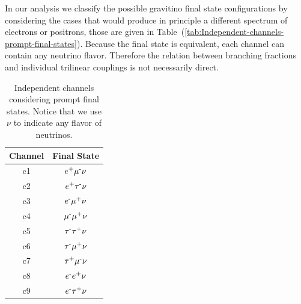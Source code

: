\documentclass[a4paper,11pt]{article}
\begin{document}
In our analysis we classify the possible gravitino final state configurations by considering the cases that would produce in principle a different spectrum of electrons or positrons, those are given in Table~(\ref{tab:Independent-channels-prompt-final-states}). Because the final state is equivalent, 
each channel can contain any neutrino flavor. Therefore the relation between branching fractions and individual trilinear couplings is not necessarily direct.


\begin{table}
\centering{}%
\begin{tabular}{|c|c|}
\hline 
Channel & Final State \tabularnewline
\hline 
\hline 
c1 & $e\text{\textsuperscript{+}}\mu\text{\textsuperscript{-}}\nu$ \tabularnewline
\hline 
c2 & $e\text{\textsuperscript{+}}\tau\text{\textsuperscript{-}}\nu$  \tabularnewline
\hline 
c3 & $e\text{\textsuperscript{-}}\mu\text{\textsuperscript{+}}\nu$ \tabularnewline
\hline 
c4 & $\mu\text{\textsuperscript{-}}\mu\text{\textsuperscript{+}}\nu$ \tabularnewline
\hline 
c5 & $\tau\text{\textsuperscript{-}}\tau\text{\textsuperscript{+}}\nu$ \tabularnewline
\hline 
c6 & $\tau\text{\textsuperscript{-}}\mu\text{\textsuperscript{+}}\nu$ \tabularnewline
\hline 
c7 & $\tau\text{\textsuperscript{+}}\mu\text{\textsuperscript{-}}\nu$ \tabularnewline
\hline 
c8 & $e\text{\textsuperscript{-}}e\text{\textsuperscript{+}}\nu$  \tabularnewline
\hline 
c9 & $e\text{\textsuperscript{-}}\tau\text{\textsuperscript{+}}\nu$ \tabularnewline
\hline 
\end{tabular}\caption{\label{tab:Independent-channels-prompt-final-states}Independent channels
considering prompt final states. Notice that we use $\nu$ to indicate
any flavor of neutrinos. }
\label{table:accesible-decay-channels-TRpV}
\end{table}
\end{document}
